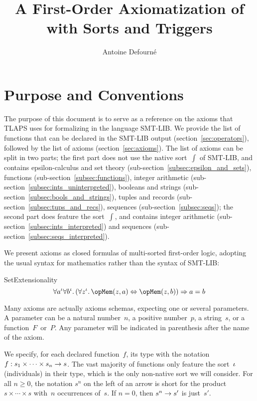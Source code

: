 \documentclass[11pt, a4paper, oneside]{article}
\title{A First-Order Axiomatization of \TLA with Sorts and Triggers}
\author{Antoine Defourné}
\date{}
\begin{document}
\pagestyle{empty}

\section{Purpose and Conventions}

The purpose of this document is to serve as a reference on the axioms that TLAPS uses for formalizing \TLA in the language SMT-LIB.  We provide the list of functions that can be declared in the SMT-LIB output (section~\ref{sec:operators}), followed by the list of axioms (section~\ref{sec:axioms}).  The list of axioms can be split in two parts; the first part does not use the native sort~$\int$ of SMT-LIB, and contains epsilon-calculus and set theory (sub-section~\ref{subsec:epsilon_and_sets}), functions (sub-section~\ref{subsec:functions}), integer arithmetic (sub-section~\ref{subsec:ints_uninterpreted}), booleans and strings (sub-section~\ref{subsec:bools_and_strings}), tuples and records (sub-section~\ref{subsec:tups_and_recs}), sequences (sub-section~\ref{subsec:seqs}); the second part does feature the sort~$\int$, and contains integer arithmetic (sub-section~\ref{subsec:ints_interpreted}) and sequences (sub-section~\ref{subsec:seqs_interpreted}).

We present axioms as closed formulas of multi-sorted first-order logic, adopting the usual syntax for mathematics rather than the syntax of SMT-LIB:
\begin{axioms}
\item[SetExtensionality] \[
        \forall a^\idv \forall b^\idv.\, (\forall z^\idv.\, \opMem(z, a) \eqv \opMem(z, b)) \imp a = b
    \]

\end{axioms}

Many axioms are actually axioms schemas, expecting one or several parameters.  A parameter can be a natural number~$n$, a positive number~$p$, a string~$s$, or a function~$F$~or~$P$.  Any parameter will be indicated in parenthesis after the name of the axiom.

We specify, for each declared function~$f$, its type with the notation $f : s_1 \times \cdots \times s_n \rightarrow s$.  The vast majority of functions only feature the sort~$\iota$ (individuals) in their type, which is the only non-native sort we will consider.  For all $n \ge 0$, the notation $s^n$ on the left of an arrow is short for the product $s \times \cdots \times s$ with~$n$ occurrences of~$s$.  If $n = 0$, then $s^n \rightarrow s'$ is just~$s'$.
\end{document}
